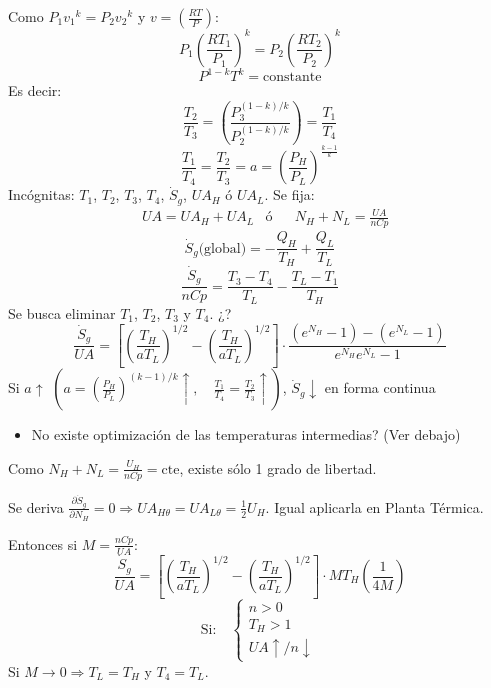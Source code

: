 \documentclass{article}
\begin{document}
Como $P_1{v_1}^{k}=P_2{v_2}^{k}$ y $v=\left(\frac{RT}{P}\right)$:
\begin{equation}
    P_1\left(\frac{RT_1}{P_1}\right)^k=P_2\left(\frac{RT_2}{P_2}\right)^k
\end{equation}
\begin{equation}
    P^{1-k}T^k=\text{constante}
\end{equation}
Es decir:
\begin{equation}
    \frac{T_2}{T_3}=\left(\frac{P_3^{\left(1-k\right)/k}}{P_2^{\left(1-k\right)/k}}\right)=\frac{T_1}{T_4}
\end{equation}
\begin{equation}
    \frac{T_1}{T_4}=\frac{T_2}{T_3}=a=\left(\frac{P_H}{P_L}\right)^{\frac{k-1}{k}}
\end{equation}
Incógnitas: $T_1$, $T_2$, $T_3$, $T_4$, $\dot{S}_g$, $UA_H$ ó $UA_L$.
Se fija:
\begin{align}
    &UA=UA_H+UA_L &\text{ó}&& N_H+N_L=\frac{UA}{nCp} 
\end{align}
\begin{equation}
    \dot{S}_g\text{(global)}=-\frac{Q_H}{T_H}+\frac{Q_L}{T_L}
\end{equation}
\begin{equation}
    \frac{\dot{S}_g}{nCp}=\frac{T_3-T_4}{T_L}-\frac{T_L-T_1}{T_H}
\end{equation}
Se busca eliminar $T_1$, $T_2$, $T_3$ y $T_4$. ¿?
\color{blue}
\begin{equation}
    \frac{\dot{S}_g}{UA}=\left[\left(\frac{T_H}{aT_L}\right)^{1/2}-\left(\frac{T_H}{aT_L}\right)^{1/2}\right]\cdot\frac{\left(e^{N_H}-1\right)-\left(e^{N_L}-1\right)}{e^{N_H}e^{N_L}-1}
\end{equation}
\color{black}
Si $a\uparrow$ $\left(a=\left(\frac{P_H}{P_L}\right)^{\left(k-1\right)/k}\uparrow,\quad\frac{T_1}{T_4}=\frac{T_2}{T_3}\uparrow\right)$, $\dot{S}_g \downarrow$ en forma continua
\begin{itemize}
    \item No existe optimización de las temperaturas intermedias? (Ver debajo)
\end{itemize}
Como $N_H+N_L=\frac{U_H}{nCp}=\text{cte}$, existe sólo 1 grado de libertad.

Se deriva $\frac{\partial \dot{S}_g}{\partial N_H}=0\Longrightarrow UA_{H\theta}=UA_{L\theta}=\frac{1}{2}U_H$. Igual aplicarla en Planta Térmica.

Entonces si $M=\frac{nCp}{UA}$:
\color{blue}
\begin{equation}
    \frac{\dot{S}_g}{UA}=\left[\left(\frac{T_H}{aT_L}\right)^{1/2}-\left(\frac{T_H}{aT_L}\right)^{1/2}\right]\cdot M T_H\left(\frac{1}{4M}\right)
\end{equation}
\color{black}
\begin{equation}
\text{Si:}\quad
    \begin{cases}
      n>0 \\
      T_H>1 \\
      UA\uparrow/n\downarrow
\end{cases}
\end{equation}
Si $M\xrightarrow{} 0\Longrightarrow T_L=T_H$  y  $T_4=T_L$.
\end{document}
